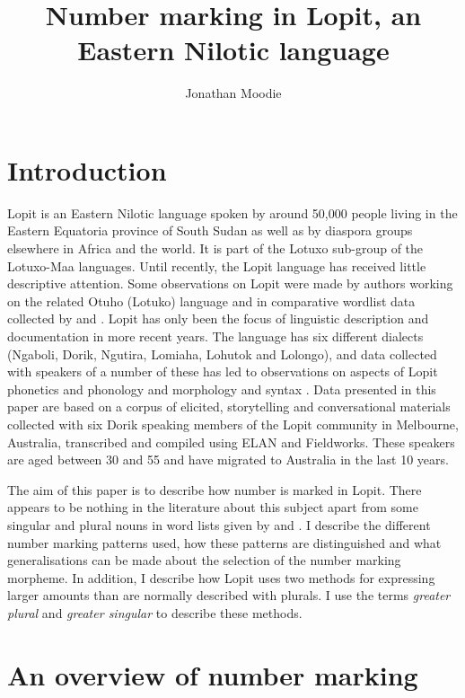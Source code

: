 \documentclass[output=paper]{langsci/langscibook}
\title{Number marking in Lopit, an Eastern Nilotic language}
\author{%
Jonathan Moodie \affiliation{University of Melbourne}
}
\begin{document}
\section{Introduction} \label{sec:moodie:1}

Lopit is an Eastern Nilotic language spoken by around 50,000 people living in the Eastern Equatoria province of South Sudan as well as by diaspora groups elsewhere in Africa and the world. It is part of the Lotuxo sub-group of the Lotuxo-Maa languages. Until recently, the Lopit language has received little descriptive attention. Some observations on Lopit were made by authors working on the related Otuho (Lotuko) language \citep{Muratori1938} and in comparative wordlist data collected by \citet{Driberg1932} and \citet{Vossen1982}. Lopit has only been the focus of linguistic description and documentation in more recent years. The language has six different dialects (Ngaboli, Dorik, Ngutira, Lomiaha, Lohutok and Lolongo), and data collected with speakers of a number of these has led to observations on aspects of Lopit phonetics and phonology \citep{Turner2001,Stirtz2014,Billington2014} and morphology and syntax \citep[e.g.][]{Laduetal2014}. Data presented in this paper are based on a corpus of elicited, storytelling and conversational materials collected with six Dorik speaking members of the Lopit community in Melbourne, Australia, transcribed and compiled using ELAN and Fieldworks. These speakers are aged between 30 and 55 and have migrated to Australia in the last 10 years.

The aim of this paper is to describe how number is marked in Lopit. There appears to be nothing in the literature about this subject apart from some singular and plural nouns in word lists given by \citet{Driberg1932} and \citet{Vossen1982}. I describe the different number marking patterns used, how these patterns are distinguished and what generalisations can be made about the selection of the number marking morpheme. In addition, I describe how Lopit uses two methods for expressing larger amounts than are normally described with plurals. I use the terms \textit{greater plural} and \textit{greater singular} to describe these methods. 

\section{An overview of number marking}\label{sec:moodie:2}
\end{document}
